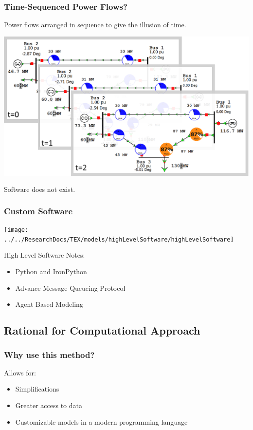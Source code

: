 \documentclass[14pt, unknownkeysallowed]{beamer}
\begin{document}
\begin{frame}
\frametitle{Time-Sequenced Power Flows?}
Power flows arranged in sequence to give the illusion of time.\\
\begin{center}
	\includegraphics[width=.6\linewidth]{powerFlowSequence}
\end{center}
Software does not exist.
\end{frame}
\begin{frame}
\frametitle{Custom Software}
\begin{center}
	\texttt{[image: ../../ResearchDocs/TEX/models/highLevelSoftware/highLevelSoftware]}
\end{center}

High Level Software Notes:\\
\begin{itemize}
	\item Python and IronPython
	\item Advance Message Queueing Protocol
	\item Agent Based Modeling
\end{itemize}



\end{frame}
\subsection{Rational for Computational Approach}
\begin{frame}
\frametitle{Why use this method?}
Allows for:
\begin{itemize}
\item Simplifications
\item Greater access to data
\item Customizable models in a modern programming language
\end{itemize}
\end{frame}
\end{document}
